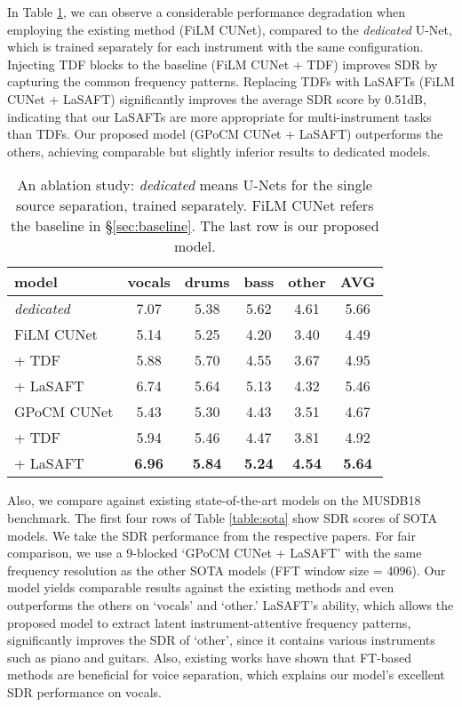 \documentclass{article}
\begin{document}
In Table \ref{table:ablation}, we can observe a considerable performance degradation when employing the existing method (FiLM CUNet), compared to the \textit{dedicated} U-Net,  which is trained separately for each instrument with the same configuration.
Injecting TDF blocks to the baseline (FiLM CUNet + TDF) improves SDR by capturing the common frequency patterns. Replacing TDFs with LaSAFTs (FiLM CUNet + LaSAFT) significantly improves the average SDR score by 0.51dB, indicating that our LaSAFTs are more appropriate for multi-instrument tasks than TDFs.
Our proposed model (GPoCM CUNet + LaSAFT) outperforms the others, achieving comparable but slightly inferior results to dedicated models.

\begin{table}[]
\begin{tabular}{l|c|c|c|c|c}
\hline
model             & vocals & drums & bass & other & AVG \\ \hline
\textit{dedicated} \cite{tfctdf}     & 7.07   & 5.38  & 5.62 & 4.61  & 5.66    \\ \hline
FiLM CUNet     & 5.14   & 5.25  & 4.20 & 3.40  & 4.49    \\ 
 \quad + TDF    & 5.88   & 5.70  & 4.55 & 3.67  & 4.95    \\ 
 \quad + LaSAFT   & 6.74    & 5.64   & 5.13  & 4.32  & 5.46     \\ \hline
GPoCM CUNet    & 5.43 & 5.30 & 4.43 & 3.51  & 4.67     \\
 \quad + TDF  & 5.94   & 5.46  & 4.47 & 3.81  & 4.92    \\
 \quad + LaSAFT & \textbf{6.96}   & \textbf{5.84}  & \textbf{5.24} & \textbf{4.54}  & \textbf{5.64}    \\ \hline
\end{tabular}
    \caption{An ablation study: \textit{dedicated} means U-Nets for the single source separation, trained separately. FiLM CUNet refers the baseline in \S \ref{sec:baseline}. The last row is our proposed model. }
    \label{table:ablation}
\end{table}

Also, we compare against existing state-of-the-art models on the MUSDB18 benchmark. 
The first four rows of Table \ref{table:sota} show SDR scores of SOTA models. We take the SDR performance from the respective papers.
For fair comparison, we use a 9-blocked `GPoCM CUNet + LaSAFT' with the same frequency resolution as the other SOTA models \cite{dilatedlstm, d3net} (FFT window size = 4096). 
Our model yields comparable results against the existing methods and even outperforms the others on `vocals' and `other.'
LaSAFT's ability, which allows the proposed model to extract latent instrument-attentive frequency patterns, significantly improves the SDR of `other', since it contains various instruments such as piano and guitars.
Also, existing works \cite{tfctdf,phasen} have shown that FT-based methods are beneficial for voice separation, which explains our model's excellent SDR performance on vocals.
\end{document}
